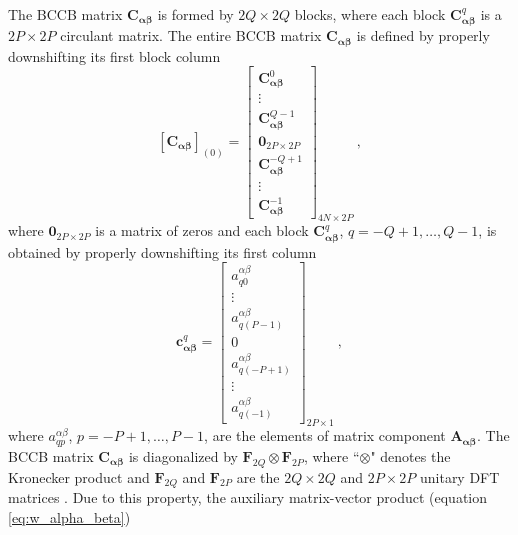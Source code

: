 The BCCB matrix $\mathbf{C}_{\boldsymbol{\alpha\beta}}$ is formed by $2Q \times 2Q$ blocks, 
where each block $\mathbf{C}_{\boldsymbol{\alpha\beta}}^{q}$ is a $2P \times 2P$ circulant matrix.
The entire BCCB matrix $\mathbf{C}_{\boldsymbol{\alpha\beta}}$ is defined by properly
downshifting its first block column
\begin{equation}
	\left[ \mathbf{C}_{\boldsymbol{\alpha\beta}} \right]_{(0)} = \begin{bmatrix}
		\mathbf{C}_{\boldsymbol{\alpha\beta}}^{0} \\
		\vdots \\
		\mathbf{C}_{\boldsymbol{\alpha\beta}}^{Q-1} \\
		\mathbf{0}_{2P \times 2P} \\
		\mathbf{C}_{\boldsymbol{\alpha\beta}}^{-Q+1} \\
		\vdots \\
		\mathbf{C}_{\boldsymbol{\alpha\beta}}^{-1}
	\end{bmatrix}_{4N \times 2P} \: ,
	\label{eq:C_alpha_beta_first_block_column}
\end{equation}
where $\mathbf{0}_{2P \times 2P}$ is a matrix of zeros and 
each block $\mathbf{C}_{\boldsymbol{\alpha\beta}}^{q}$, $q = -Q+1, \dots, Q-1$,
is obtained by properly downshifting its first column
\begin{equation}
	\mathbf{c}_{\boldsymbol{\alpha\beta}}^{q} = \begin{bmatrix}
		a^{\alpha\beta}_{q0} \\
		\vdots \\
		a^{\alpha\beta}_{q(P-1)} \\
		0 \\
		a^{\alpha\beta}_{q(-P+1)} \\
		\vdots \\
		a^{\alpha\beta}_{q(-1)}
	\end{bmatrix}_{2P \times 1} \: ,
	\label{eq:cq_alpha_beta}
\end{equation}
where $a^{\alpha\beta}_{qp}$, $p = -P+1, \dots, P-1$, are the elements of
matrix component $\mathbf{A_{\boldsymbol{\alpha\beta}}}$. 
The BCCB matrix $\mathbf{C}_{\boldsymbol{\alpha\beta}}$ is diagonalized by
$\mathbf{F}_{2Q} \otimes \mathbf{F}_{2P}$, where ``$\otimes$" denotes the Kronecker product
\citep[e.g.,][ p. 242]{horn_johnson1991} and $\mathbf{F}_{2Q}$ and $\mathbf{F}_{2P}$ are 
the $2Q \times 2Q$ and $2P \times 2P$ unitary DFT matrices \citep[][ p. 31]{davis1979}.
Due to this property, the auxiliary matrix-vector product (equation \ref{eq:w_alpha_beta}) 
